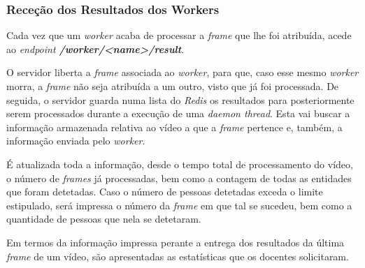 \documentclass[10pt,portuguese]{article}
\begin{document}
\subsubsection{Receção dos Resultados dos Workers}
\par Cada vez que um \textit{worker} acaba de processar a \textit{frame} que lhe foi atribuída, acede ao \textit{endpoint \textbf{/worker/<name>/result}}.

\par O servidor liberta a \textit{frame} associada ao \textit{worker}, para que, caso esse mesmo \textit{worker} morra, a \textit{frame} não seja atribuída a um outro, visto que já foi processada. De seguida, o servidor guarda numa lista do \textit{Redis} os resultados para posteriormente serem processados durante a execução de uma \textit{daemon thread}. Esta vai buscar a informação armazenada relativa ao vídeo a que a \textit{frame} pertence e, também, a informação enviada pelo \textit{worker}. 
\par É atualizada toda a informação, desde o tempo total de processamento do vídeo, o número de \textit{frames} já processadas, bem como a contagem de todas as entidades que foram detetadas. Caso o número de pessoas detetadas exceda o limite estipulado, será impressa o número da \textit{frame} em que tal se sucedeu, bem como a quantidade de pessoas que nela se detetaram. 
\par Em termos da informação impressa perante a entrega dos resultados da última \textit{frame} de um vídeo, são apresentadas as estatísticas que os docentes solicitaram. 
\end{document}

